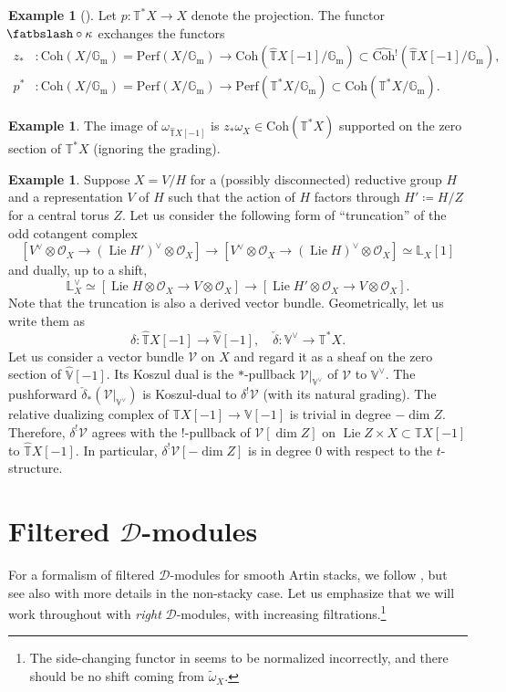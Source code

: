 \documentclass{amsart}
\theoremstyle{definition}
\newtheorem{example}[theorem]{Example}
\theoremstyle{remark}
\numberwithin{equation}{section}
\DeclareMathOperator{\Lie}{Lie}
\newcommand{\mc}{\mathcal}
\newcommand{\Gm}{{\mathbb{G}_{\mathrm{m}}}}
\newcommand{\wh}{\widehat}
\newcommand{\Coh}{\mathrm{Coh}}
\newcommand{\V}{\mathbb{V}}
\newcommand{\T}{\mathbb{T}}
\renewcommand{\L}{\mathbb{L}}
\newcommand{\Perf}{\mathrm{Perf}}
\newcommand{\unshear}{\,{\mathbin{\mkern-6mu\fatbslash}}}
\begin{document}
\begin{example}[{\cite[Theorem 2.3.6.5]{Chen2023categorical}}]
Let $p\colon \T^\ast X\to X$ denote the projection. The functor $\unshear\circ \kappa$ exchanges the functors
\begin{align*}
z_* &\colon \Coh(X/\Gm)=\Perf(X/\Gm) \to \Coh(\wh{\T}X[-1]/\Gm)\subset \wh{\Coh}{}^!(\wh{\T}X[-1]/\Gm), \\
p^* &\colon \Coh(X/\Gm)=\Perf(X/\Gm) \to \Perf(\T^\ast X/\Gm) \subset \Coh(\T^\ast X/\Gm). 
\end{align*}
\end{example}

\begin{example}
The image of $\omega_{\wh{\T}X[-1]}$ is $z_*\omega_X\in \Coh(\T^\ast X)$ supported on the zero section of $\T^\ast X$ (ignoring the grading). 
\end{example}

\begin{example}{\label{ex: derivedVB}}
Suppose $X=V/H$ for a (possibly disconnected) reductive group $H$ and a representation $V$ of $H$ such that the action of $H$ factors through $H'\coloneq H/Z$ for a central torus $Z$. Let us consider the following form of ``truncation'' of the odd cotangent complex 
\[
[V^\vee \otimes \mc O_X\to (\Lie H')^{\vee}\otimes \mc O_X]\to
[V^\vee \otimes \mc O_X\to (\Lie H)^{\vee}\otimes \mc O_X]\simeq\L_X[1]
\]
and dually, up to a shift, 
\[
\L_X^\vee \simeq [\Lie H\otimes \mc O_X\to V\otimes \mc O_X] \to
[\Lie H'\otimes \mc O_X\to V\otimes \mc O_X].
\]
Note that the truncation is also a derived vector bundle. Geometrically, let us write them as
\[
\delta\colon \wh{\T}X[-1] \to \wh{\V}[-1], \quad 
\check{\delta}\colon \V^\vee\to \T^* X. 
\]
Let us consider a vector bundle $\mc V$ on $X$ and regard it as a sheaf on the zero section of $\wh{\V}[-1]$. Its Koszul dual is the $*$-pullback $\mc V|_{\V^\vee}$ of $\mc V$ to $\V^\vee$. The pushforward $\check{\delta}_* (\mc V|_{\V^\vee})$ is Koszul-dual to $\delta^! \mc V$ (with its natural grading). The relative dualizing complex of $\T X[-1]\to \V[-1]$ is trivial in degree $-\dim Z$. Therefore, $\delta^! \mc V$ agrees with the $!$-pullback of $\mc V[\dim Z]$ on $\Lie Z \times X\subset \T X[-1]$ to $\wh{\T}X[-1]$. In particular, $\delta^! \mc V[-\dim Z]$ is in degree $0$ with respect to the $t$-structure.   
\end{example}

\section{Filtered \texorpdfstring{$\mc{D}$}{D}-modules}
For a formalism of filtered $\mc D$-modules for smooth Artin stacks, we follow \cite[\S 3.3]{Chen2023categorical}, but see also \cite{MixedHodgeProject} with more details in the non-stacky case. Let us emphasize that we will work throughout with \emph{right} $\mc D$-modules, with increasing filtrations.\footnote{The side-changing functor in \cite[\S 3.3.5]{Chen2023categorical} seems to be normalized incorrectly, and there should be no shift coming from $\widetilde{\omega}_X$.}
\end{document}
